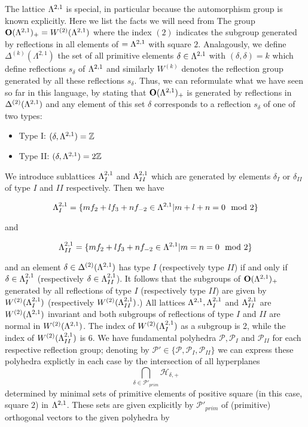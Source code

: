 \documentclass[9pt]{amsart} \usepackage[utf8]{inputenc}
\newcommand{\Z}{\mathbb{Z}} \newcommand{\C}{\mathbb{C}}
\newcommand{\Orth}{\mathbf{O}}
\newcommand{\Hpl}{\mathcal{H}}
\newcommand{\Poly}{\mathcal{P}}
\begin{document}
The lattice $\Lambda^{2,1}$ is special, in particular because the
automorphism group is known explicitly. Here we list the facts we will
need from \cite{NIKULIN:1}
The group $\Orth(\La^{2,1})_+ = W^{(2)}(\La^{2,1})$ where the index
$(2)$ indicates the subgroup generated by reflections in all elements of
$=\Lambda^{2,1}$ with square $2$. Analagously, we define
$\Delta^{(k)}(\Lambda^{2,1})$ the set of all primitive elements
$\delta \in \Lambda^{2,1}$ with $(\delta,\delta) = k$ which define
reflections $s_{\delta}$ of $\Lambda^{2,1}$ and similarly $W^{(k)}$ denotes
the reflection group generated by all these reflections $s_{\delta}$.
Thus, we can reformulate what we have seen so far in this language, by
stating that $\Orth(\La^{2,1})_+$ is generated by reflections in
$\Delta^{(2)}(\Lambda^{2,1})$ and any element of this set $\delta$
corresponds to a reflection $s_{\delta}$ of one of two types:
\begin{itemize}
\item Type I: $(\delta, \La^{2,1}) = \Z$
\item Type II: $(\delta, \La^{2,1}) = 2\Z$
\end{itemize}

We introduce sublattices $\Lambda^{2,1}_I$ and $\Lambda^{2,1}_{II}$ which are
generated by elements $\delta_I$ or $\delta_{II}$ of type $I$ and $II$
respectively. Then we have

$$\Lambda^{2,1}_I = \{m f_2 + l f_3 + n f_{-2} \in \Lambda^{2,1} | m + l + n = 0 \mod 2\}$$

and

$$\Lambda^{2,1}_{II} = \{m f_2 + l f_3 + n f_{-2} \in \Lambda^{2,1} | m = n =  0 \mod 2\}$$

and an element $\delta \in \Delta^{(2)}(\Lambda^{2,1})$ has type $I$
(respectively type $II$) if and only if $\delta \in \Lambda^{2,1}_I$
(respectively $\delta \in \Lambda^{2,1}_{II}$). It follows that the
subgroups of $\Orth(\La^{2,1})_+$ generated by all reflections of type
$I$ (respectively type $II$) are given by $W^{(2)}(\Lambda^{2,1}_I)$
(respectively $W^{(2)}(\Lambda^{2,1}_{II})$.) All lattices $\Lambda^{2,1},
 \Lambda^{2,1}_I$ and $\Lambda^{2,1}_{II}$ are $W^{(2)}(\Lambda^{2,1})$ invariant and
 both subgroups of reflections of type $I$ and $II$ are normal in
 $W^{(2)}(\Lambda^{2,1})$. The index of $W^{(2)}(\Lambda^{2,1}_I)$ as a subgroup
 is 2, while the index of $W^{(2)}(\Lambda^{2,1}_{II})$ is $6$. We have
 fundamental polyhedra $\Poly, \Poly_I$ and $\Poly_{II}$ for each
 respective reflection group; denoting by $\Poly' \in \{\Poly, \Poly_I,
 \Poly_{II}\}$ we can express these polyhedra explictly in each case by
 the intersection of all hyperplanes $$\displaystyle\bigcap_{\delta \in
 \Poly'_{prim}} \Hpl_{\delta,+}$$ determined by minimal sets of
 primitive elements of positive square (in this case, square $2$) in
 $\Lambda^{2,1}$. These sets are given explicitly by $\Poly'_{prim}$ of
 (primitive) orthogonal vectors to the given polyhedra by
\end{document}
